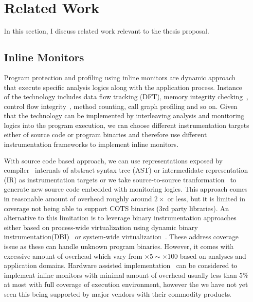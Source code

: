 \section{Related Work}
\label{sec:related}
In this section, I discuss related work relevant to the thesis proposal. 

\subsection{Inline Monitors}
\label{ssec:inline}

Program protection and profiling using inline monitors are dynamic approach
that execute specific analysis logics along with the application process.
Instance of the technology includes data flow tracking (DFT), memory integrity
checking~\cite{memcheck, drmemory:cgo2011}, control flow integrity~\cite{cfi},
method counting, call graph profiling and so on. Given that the technology can
be implemented by interleaving analysis and monitoring logics into the program
execution, we can choose different instrumentation targets either of source
code or program binaries and therefore use different instrumentation frameworks
to implement inline monitors.

With source code based approach, we can use representations exposed  by
compiler~\cite{llvm:cgo04} internals of abstract syntax tree (AST) or
intermedidate representation (IR) as instrumentation targets or we take
source-to-source tranformation~\cite{txl, cil} to generate new source code
embedded with monitoring logics. This approach comes in reasonable amount of
overhead roughly around $2\times$ or less, but it is limited in coverage not
being able to support COTS binaries (\ie 3rd party libraries).  An alternative
to this limitation is to leverage binary instrumentation approaches either
based on process-wide virtualization using dynamic binary
instrumentation(DBI)~\cite{pin:pldi2005, dynamorio, valgrind} or system-wide
virtualization~\cite{qemu:usenix05, xen:sosp2003}. These address coverage issue
as these can handle unknown program binaries. However, it comes with excessive
amount of overhead which vary from $\times 5 \sim \times 100$ based on analyses
and application domains. Hardware assisted
implementation~\cite{raksha:isca2007, lba:isca2008} can be considered to
implement inline monitors with minimal amount of overhead usually less than 5\%
at most with full coverage of execution environment, however the we have not
yet seen this being supported by major vendors with their commodity products.

